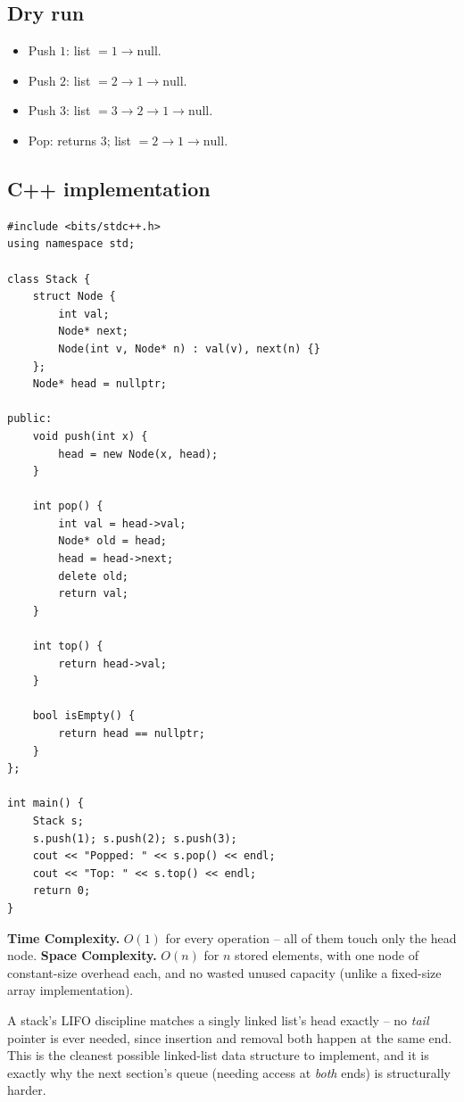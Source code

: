\subsection*{Dry run}


\begin{itemize}
  \item Push $1$: list $= 1 \to \text{null}$.
  \item Push $2$: list $= 2 \to 1 \to \text{null}$.
  \item Push $3$: list $= 3 \to 2 \to 1 \to \text{null}$.
  \item Pop: returns $3$; list $= 2 \to 1 \to \text{null}$.
\end{itemize}

\subsection*{C++ implementation}

\begin{lstlisting}
#include <bits/stdc++.h>
using namespace std;

class Stack {
    struct Node {
        int val;
        Node* next;
        Node(int v, Node* n) : val(v), next(n) {}
    };
    Node* head = nullptr;

public:
    void push(int x) {
        head = new Node(x, head);
    }

    int pop() {
        int val = head->val;
        Node* old = head;
        head = head->next;
        delete old;
        return val;
    }

    int top() {
        return head->val;
    }

    bool isEmpty() {
        return head == nullptr;
    }
};

int main() {
    Stack s;
    s.push(1); s.push(2); s.push(3);
    cout << "Popped: " << s.pop() << endl;
    cout << "Top: " << s.top() << endl;
    return 0;
}
\end{lstlisting}

\begin{complexitybox}
\textbf{Time Complexity.} $O(1)$ for every operation -- all of them touch
only the head node.
\textbf{Space Complexity.} $O(n)$ for $n$ stored elements, with one node
of constant-size overhead each, and no wasted unused capacity (unlike a
fixed-size array implementation).
\end{complexitybox}

\begin{takeawaybox}
A stack's LIFO discipline matches a singly linked list's head exactly --
no \textit{tail} pointer is ever needed, since insertion and removal both
happen at the same end. This is the cleanest possible linked-list data
structure to implement, and it is exactly why the next section's queue
(needing access at \emph{both} ends) is structurally harder.
\end{takeawaybox}
